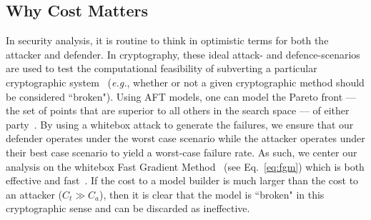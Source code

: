 \documentclass[conference]{IEEEtran}
\begin{document}
{\subsection{Why Cost Matters}

In security analysis, it is  routine to think in optimistic terms for both the attacker and defender. 
In cryptography, these ideal attack- and defence-scenarios are used to test the computational feasibility of subverting a particular cryptographic system~\cite{kamal2017study,leurent2020sha} (\textit{e.g.}, whether or not a given cryptographic method should be considered ``broken"). 
Using AFT models, one can model the Pareto front --- the set of points that are superior to all others in the search space --- of either party~\cite{zitzler2008quality}. 
By using a whitebox attack to generate the failures, we ensure that our defender operates under the worst case scenario while the attacker operates under their best case scenario to yield a worst-case failure rate.
As such, we center our analysis on the whitebox Fast Gradient Method~\cite{fgm} (see Eq.~\ref{eq:fgm}) which is both effective and fast~\cite{meyers}. 
If the cost to a model builder is much larger than the cost to an attacker ($C_t \gg C_a$), then it is  clear that the model is ``broken" in this cryptographic sense and can be discarded as ineffective. 

}
\end{document}
